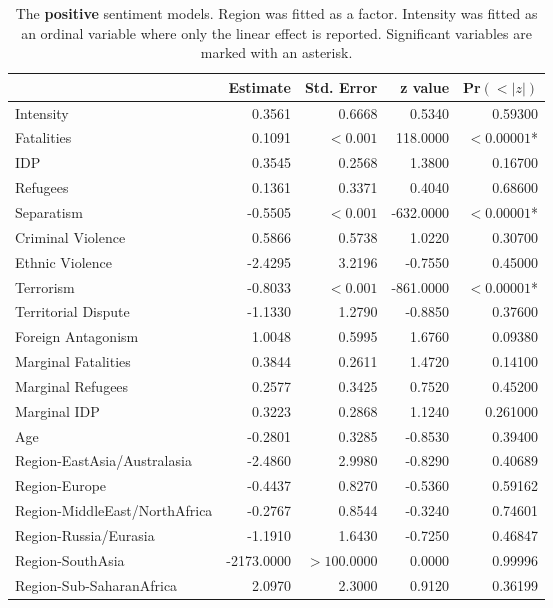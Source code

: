\begin{table}
\centering
\begin{tabular}{l|rrrr}
& Estimate                    & Std. Error & z value & Pr$(<|z|)$  \\ \hline
Intensity                   & 0.3561 & 0.6668 & 0.5340 & 0.59300 \\ 
Fatalities                    & 0.1091 &  $<0.001$ & 118.0000 & $<0.00001$* \\ 
IDP                           & 0.3545 & 0.2568 & 1.3800 & 0.16700 \\ 
Refugees                      & 0.1361 & 0.3371 & 0.4040 & 0.68600 \\ 
Separatism                    & -0.5505 & $<0.001$ & -632.0000 & $<0.00001$* \\ 
Criminal Violence             & 0.5866 & 0.5738 & 1.0220 & 0.30700 \\ 
Ethnic Violence               & -2.4295 & 3.2196 & -0.7550 & 0.45000 \\ Terrorism                     & -0.8033 & $<0.001$ & -861.0000 &  $<0.00001$* \\ 
Territorial Dispute           & -1.1330 & 1.2790 & -0.8850 & 0.37600 \\ 
Foreign Antagonism            & 1.0048 & 0.5995 & 1.6760 & 0.09380 \\ 
Marginal Fatalities           & 0.3844 & 0.2611 & 1.4720 & 0.14100 \\ 
Marginal Refugees             & 0.2577 & 0.3425 & 0.7520 & 0.45200 \\ 
Marginal IDP                  & 0.3223 & 0.2868 & 1.1240 & 0.261000 \\ 
Age                           & -0.2801 & 0.3285 & -0.8530 & 0.39400 \\ 
Region-EastAsia/Australasia     & -2.4860 & 2.9980 & -0.8290 & 0.40689 \\ 
Region-Europe                 & -0.4437 &  0.8270 & -0.5360 & 0.59162 \\ 
Region-MiddleEast/NorthAfrica & -0.2767 & 0.8544 & -0.3240 & 0.74601 \\ 
Region-Russia/Eurasia         & -1.1910 & 1.6430 & -0.7250 & 0.46847 \\ 
Region-SouthAsia              & -2173.0000 & $>100.0000$ & 0.0000 & 0.99996 \\ 
Region-Sub-SaharanAfrica       & 2.0970 & 2.3000 & 0.9120 & 0.36199  
\end{tabular}
\caption{The \textbf{positive} sentiment models. Region was fitted as a factor. Intensity was fitted as an ordinal variable where only the linear effect is reported. Significant variables are marked with an asterisk.}
\label{posfix}
\end{table}


